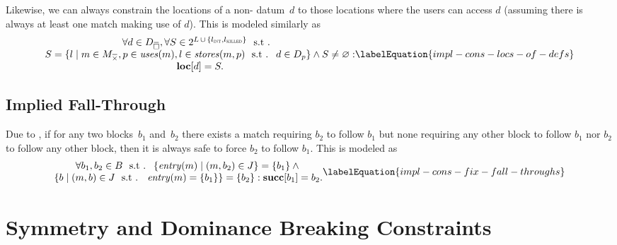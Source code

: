 Likewise, we can always constrain the \glspl{location} of a non- \gls{datum}~$d$ to those \glspl{location} where the users can access $d$
(assuming there is always at least one \gls{match} making use of $d$).
%
This is modeled similarly as
%
\begin{equation}
  \begin{array}{@{}c@{}}
    \forall d \in \mStateDataCompSet,
    \forall S \in
      \mPowerset{\mLocationSet
      \, \cup \,
      \mSet{\mIntLocation, \mKilledLocation}} \text{ \st} \\
    S = \mSetBuilder{l}%
                    {%
                      m \in \mKillMatchCompSet,
                      p \in \mUses(m),
                      l \in \mStores(m, p)
                      \text{ \st }
                      d \in \mDataSet[p]
                    }
    \mAnd
    S \neq \mEmptySet : \\
    \mVar{loc}[d] = S.
  \end{array}
  \labelEquation{impl-cons-locs-of-defs}
\end{equation}


\subsection{Implied Fall-Through}

Due to , if for any two \glspl{block}~$b_1$ and~$b_2$
there exists a \gls{match} requiring $b_2$ to follow $b_1$ but none requiring
any other \gls{block} to follow $b_1$ nor $b_2$ to follow any other \gls{block},
then it is always safe to force $b_2$ to follow $b_1$.
%
This is modeled as
%
\begin{equation}
  \begin{array}{@{}c@{}}
    \forall b_1, b_2 \in \mBlockSet
    \text{ \st }
    \mSetBuilder{\mEntry(m)}{\mPair{m}{b_2} \in \mFallThroughSet} = \mSet{b_1}
    \mAnd \mbox{} \\
    \mSetBuilder{b}%
                {%
                  \mPair{m}{b} \in \mFallThroughSet
                  \text{ \st }
                  \mEntry(m) = \mSet{b_1}%
                } = \mSet{b_2} :
    \mVar{succ}[b_1] = b_2.
  \end{array}
  \labelEquation{impl-cons-fix-fall-throughs}
\end{equation}


\section{Symmetry and Dominance Breaking Constraints}

